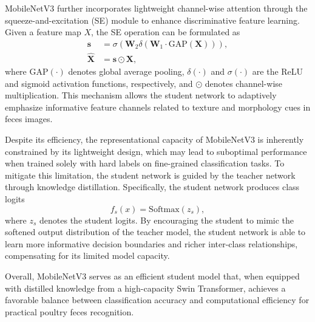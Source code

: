 \documentclass[review]{elsarticle}
\begin{document}
MobileNetV3 further incorporates lightweight channel-wise attention through the squeeze-and-excitation (SE) module to enhance discriminative feature learning. Given a feature map $X$, the SE operation can be formulated as
\begin{equation}
\begin{aligned}
\mathbf{s} &= \sigma(\mathbf{W}_2 \delta(\mathbf{W}_1 \cdot \text{GAP}(\mathbf{X}))), \\
\hat{\mathbf{X}} &= \mathbf{s} \odot \mathbf{X},
\end{aligned}
\label{eq:se_block}
\end{equation}
where $\text{GAP}(\cdot)$ denotes global average pooling,  $\delta(\cdot)$ and $\sigma(\cdot)$ are the ReLU and sigmoid activation functions, respectively, and $\odot$ denotes channel-wise multiplication. This mechanism allows the student network to adaptively emphasize informative feature channels related to texture and morphology cues in feces images.

Despite its efficiency, the representational capacity of MobileNetV3 is inherently constrained by its lightweight design, which may lead to suboptimal performance when trained solely with hard labels on fine-grained classification tasks. To mitigate this limitation, the student network is guided by the teacher network through knowledge distillation. Specifically, the student network produces class logits
\begin{equation}
f_{s}(x) = \text{Softmax}(z_s),
\label{eq:student_output}
\end{equation}
where $z_s$ denotes the student logits. By encouraging the student to mimic the softened output distribution of the teacher model, the student network is able to learn more informative decision boundaries and richer inter-class relationships, compensating for its limited model capacity.

Overall, MobileNetV3 serves as an efficient student model that, when equipped with distilled knowledge from a high-capacity Swin Transformer, achieves a favorable balance between classification accuracy and computational efficiency for practical poultry feces recognition.
\end{document}
